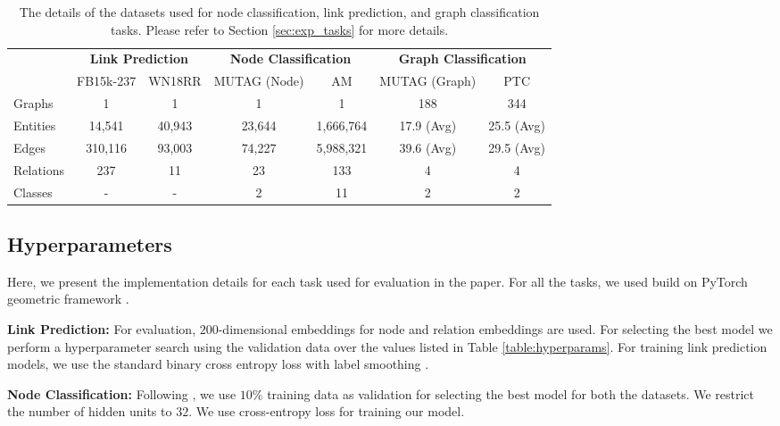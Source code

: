\documentclass{article} \usepackage{iclr2020_conference,times}
\begin{document}
\begin{table}[t]
	\centering
	\small
	\begin{tabular}{lcccccc}
		\toprule
		&  \multicolumn{2}{c}{\bf Link Prediction} & \multicolumn{2}{c}{\bf Node Classification} & \multicolumn{2}{c}{\bf Graph Classification}\\ 
		\cmidrule(r){2-3} \cmidrule(r){4-5} \cmidrule(r){6-7} 
		& \multicolumn{1}{c}{FB15k-237} & \multicolumn{1}{c}{WN18RR} & \multicolumn{1}{c}{MUTAG (Node)} &  \multicolumn{1}{c}{AM} & \multicolumn{1}{c}{MUTAG (Graph)} & \multicolumn{1}{c}{PTC}\\
		\midrule
		Graphs   & 1 & 1 & 1 & 1 & 188 & 344 \\
		Entities   & 14,541 & 40,943 & 23,644 & 1,666,764 & 17.9 (Avg) & 25.5 (Avg)\\
		Edges 	  & 310,116 & 93,003 & 74,227 & 5,988,321 & 39.6 (Avg) & 29.5 (Avg)\\
		Relations & 237 & 11 & 23 & 133 & 4 & 4 \\
Classes   & - & - & 2 & 11 & 2 & 2\\
		\bottomrule
	\end{tabular}
	
	\caption{\label{table:rgcn_data}The details of the datasets used for node classification, link prediction, and graph classification tasks. Please refer to Section \ref{sec:exp_tasks} for more details.}
\end{table}


\subsection{Hyperparameters}
\label{sec:hyperparams}
Here, we present the implementation details for each task used for evaluation in the paper. For all the tasks, we used \method{} build on PyTorch geometric framework \citep{pytorch_geometric}. 

\noindent \textbf{Link Prediction:} For evaluation, $200$-dimensional embeddings for node and relation embeddings are used. For selecting the best model we perform a hyperparameter search using the validation data over the values listed in Table \ref{table:hyperparams}. For training link prediction models, we use the standard binary cross entropy loss with label smoothing \cite{conve}. 

\noindent \textbf{Node Classification:} Following \citet{r_gcn}, we use $10$\% training data as validation for selecting the best model for both the datasets. We restrict the number of hidden units to $32$. We use cross-entropy loss for training our model. 
\end{document}
